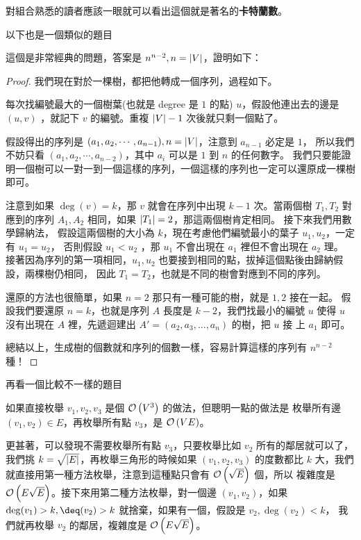 \documentclass[a4paper,12pt]{book}
\begin{document}
對組合熟悉的讀者應該一眼就可以看出這個就是著名的{\bf 卡特蘭數}。

以下也是一個類似的題目

這個是非常經典的問題，答案是 $n^{n-2}, n = \lvert V \rvert$，證明如下：
\begin{proof}
  我們現在對於一棵樹，都把他轉成一個序列，過程如下。

  每次找編號最大的一個樹葉(也就是 degree 是 $1$ 的點) $u$，假設他連出去的邊是 $(u, v)$
  ，就記下 $v$ 的編號。重複 $\lvert V \rvert-1$ 次後就只剩一個點了。

  假設得出的序列是 $(a_1, a_2, \cdots, a_{n-1}), n = \lvert V \rvert$，注意到 $a_{n-1}$ 必定是 $1$，
  所以我們不妨只看 $(a_1, a_2, \cdots, a_{n-2})$，其中 $a_i$ 可以是 $1$ 到 $n$ 的任何數字。
  我們只要能證明一個樹可以一對一到一個這樣的序列，一個這樣的序列也一定可以還原成一棵樹即可。

  注意到如果 $\deg(v) = k$，那 $v$ 就會在序列中出現 $k-1$ 次。當兩個樹 $T_1, T_2$ 對
  應到的序列 $A_1, A_2$ 相同，如果 $\lvert T_1 \rvert = 2$，那這兩個樹肯定相同。 接下來我們用數學歸納法，
  假設這兩個樹的大小為 $k$，現在考慮他們編號最小的葉子 $u_1, u_2$，一定有 $u_1 = u_2$，
  否則假設 $u_1 < u_2$ ，那 $u_1$ 不會出現在 $a_1$ 裡但不會出現在 $a_2$ 理。
  接著因為序列的第一項相同，$u_1, u_2$ 也要接到相同的點，拔掉這個點後由歸納假設，兩棵樹仍相同，
  因此 $T_1 = T_2$，也就是不同的樹會對應到不同的序列。

  還原的方法也很簡單，如果 $n = 2$ 那只有一種可能的樹，就是 $1, 2$ 接在一起。
  假設我們要還原 $n = k$，也就是序列 $A$ 長度是 $k - 2$，我們找最小的編號 $u$ 使得
  $u$ 沒有出現在 $A$ 裡，先遞迴建出 $A' = (a_2, a_3, \dots, a_n)$ 的樹，把 $u$ 接
  上 $a_1$ 即可。

  總結以上，生成樹的個數就和序列的個數一樣，容易計算這樣的序列有 $n^{n-2}$ 種！
\end{proof}

再看一個比較不一樣的題目

如果直接枚舉 $v_1, v_2, v_3$ 是個 $\operatorname{\mathcal{O}}\left(V^3\right)$ 的做法，但聰明一點的做法是
枚舉所有邊 $(v_1, v_2) \in E$，再枚舉所有點 $v_3$，是 $\operatorname{\mathcal{O}}\left(VE\right)$。

更甚著，可以發現不需要枚舉所有點 $v_3$，只要枚舉比如 $v_2$ 所有的鄰居就可以了，
我們挑 $k = \sqrt{\lvert E \rvert}$，再枚舉三角形的時候如果 $(v_1, v_2, v_3)$ 的度數都比
$k$ 大，我們就直接用第一種方法枚舉，注意到這種點只會有 $\operatorname{\mathcal{O}}\left(\sqrt{E}\right)$ 個，所以
複雜度是 $\operatorname{\mathcal{O}}\left(E \sqrt{E}\right)$。接下來用第二種方法枚舉，對一個邊 $(v_1, v_2)$，如果
$\deg(v_1) > k, \deq(v_2) > k$ 就捨棄，如果有一個，假設是 $v_2, \deg(v_2) < k$，
我們就再枚舉 $v_2$ 的鄰居，複雜度是 $\operatorname{\mathcal{O}}\left(E \sqrt{E}\right)$。
\end{document}
